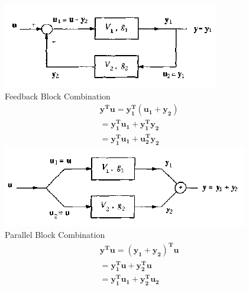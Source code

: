 \documentclass[11pt,handout]{beamer}   %
\begin{document}
\begin{frame}
\begin{columns}
\begin{column}{0.5\textwidth}
\end{column}
\begin{column}{0.5\textwidth}
\centering
\includegraphics[width = \linewidth]{Figures/Feedback.PNG}\\
Feedback Block Combination
\begin{equation*}
\begin{aligned}
&\mathbf{y^T u} = \mathbf{y_1 ^T ( u_1 + y_2 )}\\
&= \mathbf{ y_1^T u_1 + y_1^T y_2}\\
&= \mathbf{ y_1^T u_1 + u_2^T y_2 }
\end{aligned}
\end{equation*}
\includegraphics[width = \linewidth]{Figures/Parallel.PNG}\\
Parallel Block Combination
\begin{equation*}
\begin{aligned}
&\mathbf{y^T u} = \mathbf{(y_1  +y_2)^T u}\\
&= \mathbf{ y_1^T u + y_2^T u}\\
&= \mathbf{ y_1^T u_1 + y_2^T u_2 }
\end{aligned}
\end{equation*}
\end{column}
\end{columns}
\end{frame}
\end{document}
